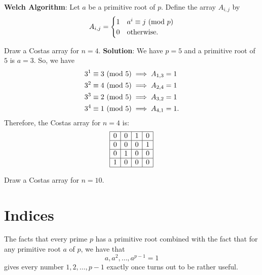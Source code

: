 \textbf{Welch Algorithm}: Let $a$ be a primitive root of $p$. Define the array $ A_{i,j} $ by
\[ A_{i,j}=\begin{cases}
        1 & a^i\equiv j\ (\mathrm{mod}\ p) \\
        0 & \text{otherwise}.
    \end{cases} \]
\begin{Example}{}{}
    Draw a Costas array for $ n=4 $.
    \tcblower{}
    \textbf{Solution}: We have $ p=5 $ and a primitive root of $ 5 $ is $ a=3 $. So, we have
    \begin{align*}
        3^1 & \equiv 3\ (\mathrm{mod}\ 5)\implies A_{1,3}=1  \\
        3^2 & \equiv 4\ (\mathrm{mod}\ 5)\implies A_{2,4}=1  \\
        3^3 & \equiv 2\ (\mathrm{mod}\ 5)\implies A_{3,2}=1  \\
        3^4 & \equiv 1\ (\mathrm{mod}\ 5)\implies A_{4,1}=1.
    \end{align*}
    Therefore, the Costas array for $ n=4 $ is:
    \[ \begin{array}{|c|c|c|c|}%
            \hline%
            0 & 0 & 1 & 0 \\
            \hline%
            0 & 0 & 0 & 1 \\
            \hline%
            0 & 1 & 0 & 0 \\
            \hline%
            1 & 0 & 0 & 0 \\
            \hline%
        \end{array} \]
\end{Example}
\begin{Exercise}{}{}
    Draw a Costas array for $ n=10 $.
\end{Exercise}

\section{Indices}
The facts that every prime $ p $ has a primitive root combined with the fact that for any primitive root $ a $ of $ p $, we have that
\[ a,a^2,\ldots,a^{p-1}=1 \]
gives every number $ 1,2,\ldots,p-1 $ exactly once turns out to be rather useful.

